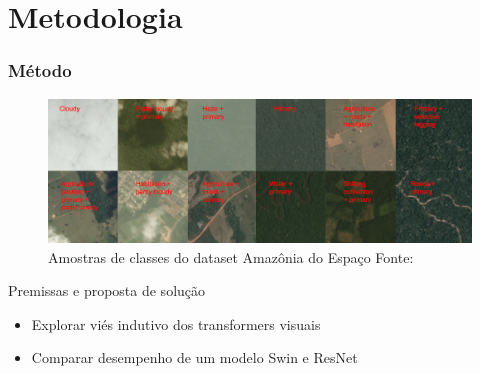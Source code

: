 \documentclass{beamer}
\begin{document}
\section{Metodologia} 

\begin{frame}

\frametitle{Método}

\begin{figure}[!ht]
    \centering
    \includegraphics[width=0.9\columnwidth]{
        Imagens/chips.jpg
    }
    \caption{Amostras de classes do dataset Amazônia do Espaço Fonte:\cite{Kaggle:PlanetAmazonFromSpace}}\label{fig:dataset}
\end{figure}
 

\end{frame}



\begin{frame}{Premissas e proposta de solução}
    \begin{itemize}
        \item Explorar viés indutivo dos transformers visuais
        \item Comparar desempenho de um modelo Swin e ResNet
    \end{itemize}
    
\end{frame}
\end{document}
